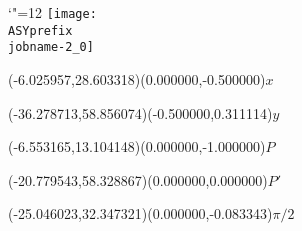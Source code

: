 \setlength{\unitlength}{1pt}%
\makeatletter%
\let\ASYencoding\f@encoding%
\let\ASYfamily\f@family%
\let\ASYseries\f@series%
\let\ASYshape\f@shape%
\makeatother%
{\catcode`"=12%
\texttt{[image: \\ASYprefix\\jobname-2\_0]}%
}%
%
\fontsize{6.000000}{7.200000}\selectfont%
\usefont{\ASYencoding}{\ASYfamily}{\ASYseries}{\ASYshape}%
\ASYalign(-6.025957,28.603318)(0.000000,-0.500000){$x$}%
%
\fontsize{6.000000}{7.200000}\selectfont%
\ASYalign(-36.278713,58.856074)(-0.500000,0.311114){$y$}%
%
\fontsize{6.000000}{7.200000}\selectfont%
\ASYalign(-6.553165,13.104148)(0.000000,-1.000000){$P$}%
%
\fontsize{6.000000}{7.200000}\selectfont%
\ASYalign(-20.779543,58.328867)(0.000000,0.000000){$P'$}%
%
\fontsize{6.000000}{7.200000}\selectfont%
\ASYalign(-25.046023,32.347321)(0.000000,-0.083343){$\pi/2$}%
